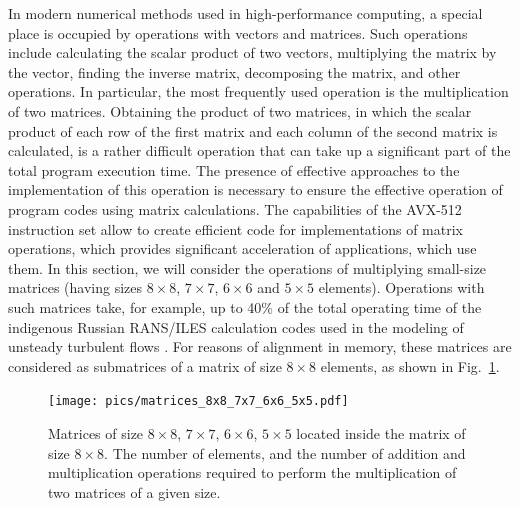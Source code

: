 \documentclass[
11pt,%
tightenlines,%
twoside,%
onecolumn,%
nofloats,%
nobibnotes,%
nofootinbib,%
superscriptaddress,%
noshowpacs,%
centertags]%
{revtex4}
\begin{document}
In modern numerical methods used in high-performance computing, a special place is occupied by operations with vectors and matrices.
Such operations include calculating the scalar product of two vectors, multiplying the matrix by the vector, finding the inverse matrix, decomposing the matrix, and other operations.
In particular, the most frequently used operation is the multiplication of two matrices.
Obtaining the product of two matrices, in which the scalar product of each row of the first matrix and each column of the second matrix is calculated, is a rather difficult operation that can take up a significant part of the total program execution time.
The presence of effective approaches to the implementation of this operation is necessary to ensure the effective operation of program codes using matrix calculations.
The capabilities of the AVX-512 instruction set allow to create efficient code for implementations of matrix operations, which provides significant acceleration of applications, which use them.
In this section, we will consider the operations of multiplying small-size matrices (having sizes $8 \times 8$, $7 \times 7$, $6 \times 6$ and $5 \times 5$ elements).
Operations with such matrices take, for example, up to 40\% of the total operating time of the indigenous Russian RANS/ILES calculation codes used in the modeling of unsteady turbulent flows \cite{Lyub_RANS_ILES, Ben_Lyub_Chest_RANS_ILES}.
For reasons of alignment in memory, these matrices are considered as submatrices of a matrix of size $8 \times 8$ elements, as shown in Fig.~\ref{fig:matrices_8x8_7x7_6x6_5x5}.

\begin{figure}[h]
\setcaptionmargin{5mm}
\onelinecaptionsfalse %
\texttt{[image: pics/matrices\_8x8\_7x7\_6x6\_5x5.pdf]}
\caption{Matrices of size $8 \times 8$, $7 \times 7$, $6 \times 6$, $5 \times 5$ located inside the matrix of size $8 \times 8$. The number of elements, and the number of addition and multiplication operations required to perform the multiplication of two matrices of a given size.}\label{fig:matrices_8x8_7x7_6x6_5x5}
\end{figure}
\end{document}
